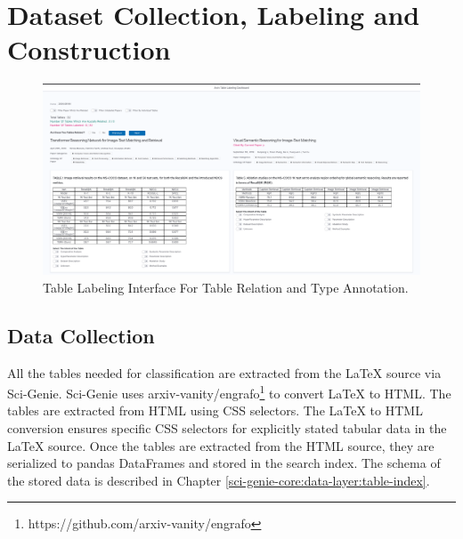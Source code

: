 \section{Dataset Collection, Labeling and Construction}
\label{table_classification:data-coll}

\begin{figure}[h]
    \centering
    \includegraphics[width=\maxwidth{\textwidth}]{src/images/table-lable-exp.pdf}
    \caption{Table Labeling Interface For Table Relation and Type Annotation. }
    \label{figure\arabic{figurecounter}}
\end{figure}

\subsection{Data Collection}
\label{table_classification:data-coll:coll}
All the tables needed for classification are extracted from the LaTeX source via Sci-Genie. Sci-Genie uses arxiv-vanity/engrafo\footnote{https://github.com/arxiv-vanity/engrafo} to convert LaTeX to HTML. The tables are extracted from HTML using CSS selectors. The LaTeX to HTML conversion ensures specific CSS selectors for explicitly stated tabular data in the LaTeX source. Once the tables are extracted from the HTML source, they are serialized to pandas DataFrames and stored in the search index. The schema of the stored data is described in Chapter \ref{sci-genie-core:data-layer:table-index}. 

